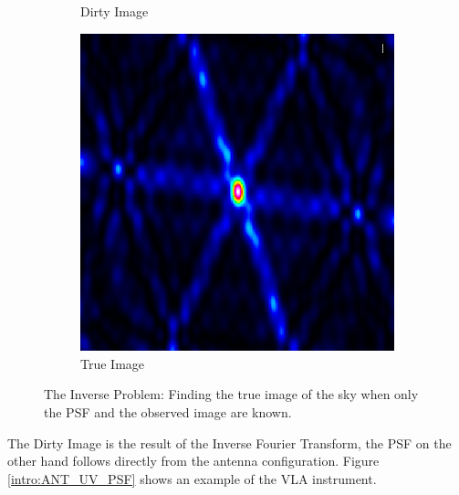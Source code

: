 \begin{figure}[h!]
\begin{subfigure}[b]{0.3\linewidth}
		\caption{Dirty Image}
	\end{subfigure}
	\begin{subfigure}[b]{0.3\linewidth}
		\includegraphics[width=\linewidth]{./chapters/01.intro/img/PSF.png}
		\caption{True Image}
	\end{subfigure}
	\caption{The Inverse Problem: Finding the true image of the sky when only the PSF and the observed image are known.}
	\label{intro:inverse_problem}
\end{figure}

The Dirty Image is the result of the Inverse Fourier Transform, the PSF on the other hand follows directly from the antenna configuration. Figure \ref{intro:ANT_UV_PSF} shows an example of the VLA instrument. 

